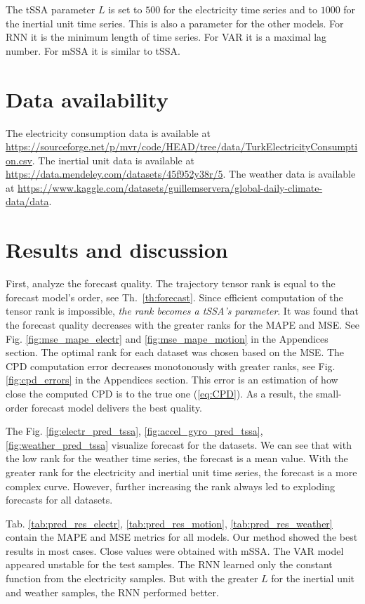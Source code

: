 \documentclass[referee, pdflatex, sn-mathphys-num]{sn-jnl}
\theoremstyle{definition}
\theoremstyle{plain}
\begin{document}
	The tSSA parameter $ L $ is set to $ 500 $ for the electricity time series and to $ 1000 $ for the inertial unit time series. This is also a parameter for the other models. For RNN it is the minimum length of time series. For VAR it is a maximal lag number. For mSSA it is similar to tSSA.
	
	\section{Data availability}
	
	The electricity consumption data is available at \url{https://sourceforge.net/p/mvr/code/HEAD/tree/data/TurkElectricityConsumption.csv}. The inertial unit data is available at \url{https://data.mendeley.com/datasets/45f952y38r/5}. The weather data is available at \url{https://www.kaggle.com/datasets/guillemservera/global-daily-climate-data/data}.
	
	\section{Results and discussion}
	
		First, analyze the forecast quality. The trajectory tensor rank is equal to the forecast model's order, see Th.~\ref{th:forecast}. Since efficient computation of the tensor rank is impossible, \emph{the rank becomes a tSSA's parameter}. It was found that the forecast quality decreases with the greater ranks for the MAPE and MSE. See Fig. {\ref{fig:mse_mape_electr}} and {\ref{fig:mse_mape_motion}} in the Appendices section. The optimal rank for each dataset was chosen based on the MSE. The CPD computation error decreases monotonously with greater ranks, see Fig. {\ref{fig:cpd_errors}} in the Appendices section. This error is an estimation of how close the computed CPD is to the true one (\ref{eq:CPD}). As a result, the small-order forecast model delivers the best quality.
	
	The Fig. {\ref{fig:electr_pred_tssa}}, {\ref{fig:accel_gyro_pred_tssa}}, {\ref{fig:weather_pred_tssa}} visualize forecast for the datasets. We can see that with the low rank for the weather time series, the forecast is a mean value. With the greater rank for the electricity and inertial unit time series, the forecast is a more complex curve. However, further increasing the rank always led to exploding forecasts for all datasets.
	
	Tab. \ref{tab:pred_res_electr}, \ref{tab:pred_res_motion}, \ref{tab:pred_res_weather} contain the MAPE and MSE metrics for all models. Our method showed the best results in most cases. Close values were obtained with mSSA. The VAR model appeared unstable for the test samples. The RNN learned only the constant function from the electricity samples. But with the greater $ L $ for the inertial unit and weather samples, the RNN performed better.
	
\end{document}
